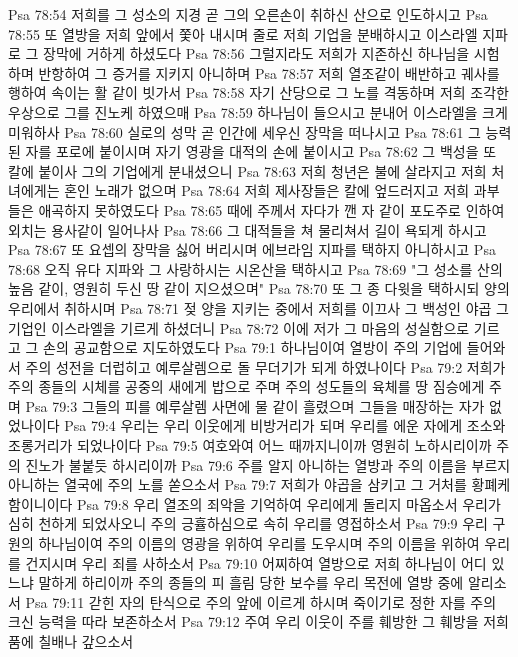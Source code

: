 Psa 78:54  저희를 그 성소의 지경 곧 그의 오른손이 취하신 산으로 인도하시고
Psa 78:55  또 열방을 저희 앞에서 쫓아 내시며 줄로 저희 기업을 분배하시고 이스라엘 지파로 그 장막에 거하게 하셨도다
Psa 78:56  그럴지라도 저희가 지존하신 하나님을 시험하며 반항하여 그 증거를 지키지 아니하며
Psa 78:57  저희 열조같이 배반하고 궤사를 행하여 속이는 활 같이 빗가서
Psa 78:58  자기 산당으로 그 노를 격동하며 저희 조각한 우상으로 그를 진노케 하였으매
Psa 78:59  하나님이 들으시고 분내어 이스라엘을 크게 미워하사
Psa 78:60  실로의 성막 곧 인간에 세우신 장막을 떠나시고
Psa 78:61  그 능력된 자를 포로에 붙이시며 자기 영광을 대적의 손에 붙이시고
Psa 78:62  그 백성을 또 칼에 붙이사 그의 기업에게 분내셨으니
Psa 78:63  저희 청년은 불에 살라지고 저희 처녀에게는 혼인 노래가 없으며
Psa 78:64  저희 제사장들은 칼에 엎드러지고 저희 과부들은 애곡하지 못하였도다
Psa 78:65  때에 주께서 자다가 깬 자 같이 포도주로 인하여 외치는 용사같이 일어나사
Psa 78:66  그 대적들을 쳐 물리쳐서 길이 욕되게 하시고
Psa 78:67  또 요셉의 장막을 싫어 버리시며 에브라임 지파를 택하지 아니하시고
Psa 78:68  오직 유다 지파와 그 사랑하시는 시온산을 택하시고
Psa 78:69  "그 성소를 산의 높음 같이, 영원히 두신 땅 같이 지으셨으며"
Psa 78:70  또 그 종 다윗을 택하시되 양의 우리에서 취하시며
Psa 78:71  젖 양을 지키는 중에서 저희를 이끄사 그 백성인 야곱 그 기업인 이스라엘을 기르게 하셨더니
Psa 78:72  이에 저가 그 마음의 성실함으로 기르고 그 손의 공교함으로 지도하였도다
Psa 79:1  하나님이여 열방이 주의 기업에 들어와서 주의 성전을 더럽히고 예루살렘으로 돌 무더기가 되게 하였나이다
Psa 79:2  저희가 주의 종들의 시체를 공중의 새에게 밥으로 주며 주의 성도들의 육체를 땅 짐승에게 주며
Psa 79:3  그들의 피를 예루살렘 사면에 물 같이 흘렸으며 그들을 매장하는 자가 없었나이다
Psa 79:4  우리는 우리 이웃에게 비방거리가 되며 우리를 에운 자에게 조소와 조롱거리가 되었나이다
Psa 79:5  여호와여 어느 때까지니이까 영원히 노하시리이까 주의 진노가 불붙듯 하시리이까
Psa 79:6  주를 알지 아니하는 열방과 주의 이름을 부르지 아니하는 열국에 주의 노를 쏟으소서
Psa 79:7  저희가 야곱을 삼키고 그 거처를 황폐케 함이니이다
Psa 79:8  우리 열조의 죄악을 기억하여 우리에게 돌리지 마옵소서 우리가 심히 천하게 되었사오니 주의 긍휼하심으로 속히 우리를 영접하소서
Psa 79:9  우리 구원의 하나님이여 주의 이름의 영광을 위하여 우리를 도우시며 주의 이름을 위하여 우리를 건지시며 우리 죄를 사하소서
Psa 79:10  어찌하여 열방으로 저희 하나님이 어디 있느냐 말하게 하리이까 주의 종들의 피 흘림 당한 보수를 우리 목전에 열방 중에 알리소서
Psa 79:11  갇힌 자의 탄식으로 주의 앞에 이르게 하시며 죽이기로 정한 자를 주의 크신 능력을 따라 보존하소서
Psa 79:12  주여 우리 이웃이 주를 훼방한 그 훼방을 저희 품에 칠배나 갚으소서
